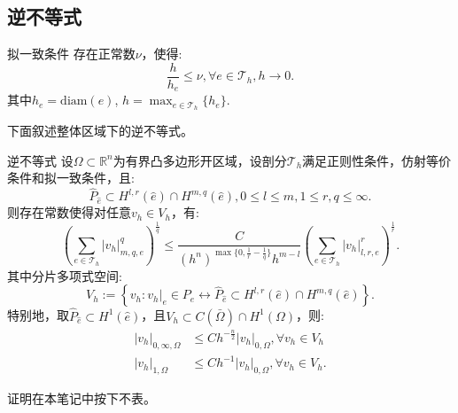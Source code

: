 \subsection{逆不等式}
\begin{definition}{拟一致条件}
    存在正常数$\nu$，使得:
    \begin{equation}
        \frac{h}{h_{e}}\le\nu,\forall e\in\mathcal{T}_{h},h\rightarrow 0.
    \end{equation}
    其中$h_{e}=\text{diam}(e)$, $h=\max_{e\in\mathcal{T}_{h}}\{h_{e}\}$.
\end{definition}
下面叙述整体区域下的逆不等式。
\begin{theorem}{逆不等式}
    设$\Omega\subset\mathbb{R}^{n}$为有界凸多边形开区域，设剖分$\mathcal{T}_{h}$满足正则性条件，仿射等价条件和拟一致条件，且:
    \begin{equation}
        \hat{P}_{\hat{e}}\subset H^{l,r}(\hat{e})\cap H^{m,q}(\hat{e}), 0\le l\le m, 1\le r,q\le \infty.
    \end{equation}
    则存在常数使得对任意$v_{h}\in V_{h}$，有:
    \begin{equation}
        \left(\sum_{e\in\mathcal{T}_{h}}|v_{h}|_{m,q,e}^{q}\right)^{\frac{1}{q}}\le\frac{C}{(h^{n})^{\max\{0,\frac{1}{r}-\frac{1}{q}\}}h^{m-l}}\left(\sum_{e\in\mathcal{T}_{h}}|v_{h}|_{l,r,e}^{r}\right)^{\frac{1}{r}}.
    \end{equation}
    其中分片多项式空间:
    \begin{equation}
        V_{h}:=\left\{v_{h}:v_{h}|_{e}\in P_{e}\leftrightarrow \hat{P}_{\hat{e}}\subset H^{l,r}(\hat{e})\cap H^{m,q}(\hat{e})\right\}.
    \end{equation}
    特别地，取$\hat{P}_{\hat{e}}\subset H^{1}(\hat{e})$，且$V_{h}\subset C(\bar{\Omega})\cap H^{1}(\Omega)$，则:
    \begin{equation}
        \begin{aligned}
        |v_{h}|_{0,\infty,\Omega}&\le Ch^{-\frac{n}{2}}|v_{h}|_{0,\Omega},\forall v_{h}\in V_{h}\\
        |v_{h}|_{1,\Omega}&\le Ch^{-1}|v_{h}|_{0,\Omega},\forall v_{h}\in V_{h}.
        \end{aligned}
    \end{equation}
\end{theorem}
证明在本笔记中按下不表。

